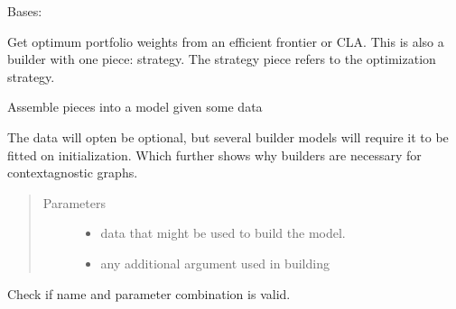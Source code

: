 \documentclass[letterpaper,10pt,english]{sphinxmanual}
\begin{document}
\begin{fulllineitems}
\label{\detokenize{dalio.pipe:dalio.pipe.builders.OptimumWeights}}
Bases: {\hyperref[\detokenize{dalio.pipe:dalio.pipe.pipe.PipeBuilder}]{}}

Get optimum portfolio weights from an efficient frontier or CLA.
This is also a builder with one piece: strategy. The strategy piece
refers to the optimization strategy.

\begin{fulllineitems}
\label{\detokenize{dalio.pipe:dalio.pipe.builders.OptimumWeights.build_model}}
Assemble pieces into a model given some data

The data will opten be optional, but several builder models will
require it to be fitted on initialization. Which further shows why
builders are necessary for context\sphinxhyphen{}agnostic graphs.
\begin{quote}\begin{description}
\item[{Parameters}] \leavevmode\begin{itemize}
\item {} 
 \textendash{} data that might be used to build the model.

\item {} 
 \textendash{} any additional argument used in building

\end{itemize}

\end{description}\end{quote}

\end{fulllineitems}


\begin{fulllineitems}
\label{\detokenize{dalio.pipe:dalio.pipe.builders.OptimumWeights.check_name}}
Check if name and parameter combination is valid.


\end{fulllineitems}
\end{fulllineitems}
\end{document}
